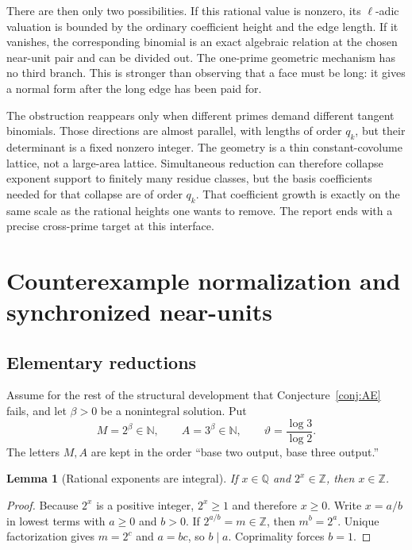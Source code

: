 \documentclass[11pt,oneside]{article}
\newtheorem{lemma}[theorem]{Lemma}
\theoremstyle{definition}
\theoremstyle{remark}
\newcommand{\N}{\mathbb N}
\newcommand{\Z}{\mathbb Z}
\newcommand{\Q}{\mathbb Q}
\newcommand{\thetaq}{\vartheta}
\begin{document}
There are then only two possibilities.  If this rational value is nonzero, its $\ell$-adic
valuation is bounded by the ordinary coefficient height and the edge length.  If it vanishes,
the corresponding binomial is an exact algebraic relation at the chosen near-unit pair and
can be divided out.  The one-prime geometric mechanism has no third branch.  This is stronger
than observing that a face must be long: it gives a normal form after the long edge has been
paid for.

The obstruction reappears only when different primes demand different tangent binomials.
Those directions are almost parallel, with lengths of order $q_k$, but their determinant is
a fixed nonzero integer.  The geometry is a thin constant-covolume lattice, not a large-area
lattice.  Simultaneous reduction can therefore collapse exponent support to finitely many
residue classes, but the basis coefficients needed for that collapse are of order $q_k$.
That coefficient growth is exactly on the same scale as the rational heights one wants to
remove.  The report ends with a precise cross-prime target at this interface.

\section{Counterexample normalization and synchronized near-units}
\label{sec:setup}

\subsection{Elementary reductions}

Assume for the rest of the structural development that Conjecture~\ref{conj:AE} fails, and
let $\beta>0$ be a nonintegral solution.  Put
\begin{equation}
 M=2^\beta\in\N,\qquad A=3^\beta\in\N,
 \qquad \thetaq=\frac{\log3}{\log2}.
 \label{eq:MA}
\end{equation}
The letters $M,A$ are kept in the order ``base two output, base three output.''

\begin{lemma}[Rational exponents are integral]
\label{lem:rational-integral}
If $x\in\Q$ and $2^x\in\Z$, then $x\in\Z$.
\end{lemma}

\begin{proof}
Because $2^x$ is a positive integer, $2^x\ge1$ and therefore $x\ge0$.  Write
$x=a/b$ in lowest terms with $a\ge0$ and $b>0$.  If $2^{a/b}=m\in\Z$, then
$m^b=2^a$.  Unique factorization gives $m=2^c$ and $a=bc$, so $b\mid a$.
Coprimality forces $b=1$.
\end{proof}
\end{document}

